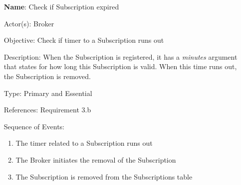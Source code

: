 \begin{itemize}
	\item[\textbf{Name}:] Check if Subscription expired
	\item[Actor(s):] Broker
	\item[Objective:] Check if timer to a Subscription runs out
	\item[Description:] When the Subscription is registered, it has a \textit{minutes} argument that states for how long this Subscription is valid. When this time runs out, the Subscription is removed.
	\item[Type:] Primary and Essential
	\item[References:] Requirement 3.b 
	\item[Sequence of Events:]\hfill
	\begin{enumerate}
		\item The timer related to a Subscription runs out
		\item The Broker initiates the removal of the Subscription
		\item The Subscription is removed from the Subscriptions table
	\end{enumerate}
\end{itemize}

